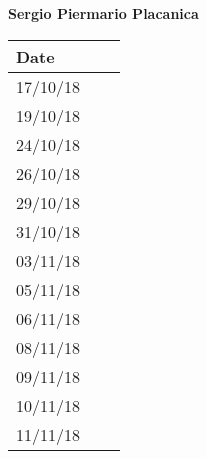 \documentclass[../main.tex]{subfiles}
\begin{document}
\begin{center}
	{\bf Sergio Piermario Placanica}
	\vspace{2mm}

		\begin{tabular}{p{1.3cm}|p{1.8cm}|p{6.7cm}}
			\hline
			\bf Date & \bf \makebox[1.8cm][c]{Hours} & \bf \makebox[6.7cm][c]{Description} \\
			\hline
			17/10/18 & \makebox[1.8cm][c]{2h} & \makebox[6.7cm][c]{Introduction}\\
			19/10/18 & \makebox[1.8cm][c]{3h} & \makebox[6.7cm][c]{Goals, Requirements, Domain assumption}\\
			24/10/18 & \makebox[1.8cm][c]{4h} & \makebox[6.7cm][c]{Goals, Requirements, Domain assumption}\\
			26/10/18 & \makebox[1.8cm][c]{2h} & \makebox[6.7cm][c]{Purpose, Scope}\\
			29/10/18 & \makebox[1.8cm][c]{2h} & \makebox[6.7cm][c]{Use Cases, UML Class Diagram}\\
			31/10/18 & \makebox[1.8cm][c]{2h} & \makebox[6.7cm][c]{Use Cases, UML Class Diagram}\\
			03/11/18 & \makebox[1.8cm][c]{5h} & \makebox[6.7cm][c]{Mockups, Scenarios}\\
			05/11/18 & \makebox[1.8cm][c]{1h} & \makebox[6.7cm][c]{Scenarios, Sequence Diagram}\\
			06/11/18 & \makebox[1.8cm][c]{4h} & \makebox[6.7cm][c]{Mockups, Alloy}\\
			08/11/18 & \makebox[1.8cm][c]{4h} & \makebox[6.7cm][c]{Mockups, Sequence Diagramm, Alloy}\\
			09/11/18 & \makebox[1.8cm][c]{4h} & \makebox[6.7cm][c]{Alloy, Revisioning}\\
			10/11/18 & \makebox[1.8cm][c]{4h} & \makebox[6.7cm][c]{Alloy, Revisioning}\\
			11/11/18 & \makebox[1.8cm][c]{4h} & \makebox[6.7cm][c]{Revisioning}\\
		\end{tabular}
\end{center}
\end{document}

